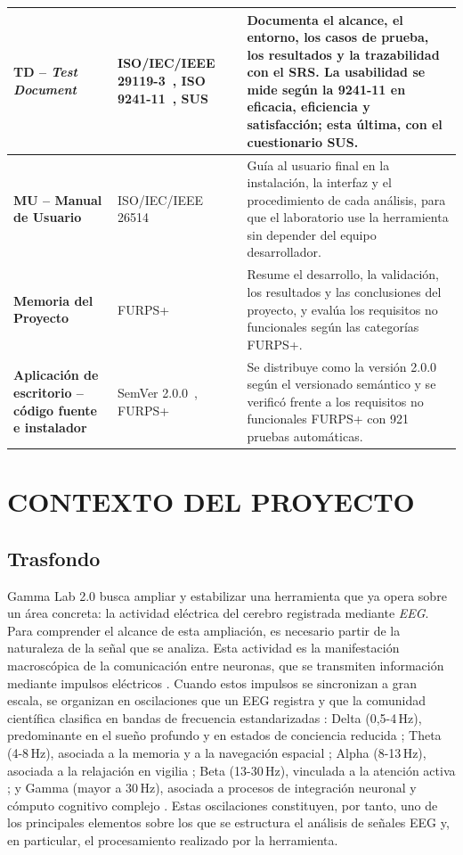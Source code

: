 \documentclass[12pt,letterpaper,oneside]{article}
\newcommand{\capitulo}[1]{\clearpage\section{#1}}
\begin{document}
\begin{longtable}{|>{\raggedright\arraybackslash}p{}|>{\raggedright\arraybackslash}p{}|>{\raggedright\arraybackslash}p{}|}
\hline
\textbf{TD -- \textit{Test Document}} & ISO/IEC/IEEE 29119-3~\cite{iso29119-3}, ISO 9241-11~\cite{iso9241-11}, SUS~\cite{brooke1996} & Documenta el alcance, el entorno, los casos de prueba, los resultados y la trazabilidad con el SRS. La usabilidad se mide según la 9241-11 en eficacia, eficiencia y satisfacción; esta última, con el cuestionario SUS. \\
\hline
\textbf{MU -- Manual de Usuario} & ISO/IEC/IEEE 26514~\cite{iso26514} & Guía al usuario final en la instalación, la interfaz y el procedimiento de cada análisis, para que el laboratorio use la herramienta sin depender del equipo desarrollador. \\
\hline
\textbf{Memoria del Proyecto} & FURPS+~\cite{eeles2001} & Resume el desarrollo, la validación, los resultados y las conclusiones del proyecto, y evalúa los requisitos no funcionales según las categorías FURPS+. \\
\hline
\textbf{Aplicación de escritorio -- código fuente e instalador} & SemVer 2.0.0~\cite{semver}, FURPS+~\cite{eeles2001} & Se distribuye como la versión 2.0.0 según el versionado semántico y se verificó frente a los requisitos no funcionales FURPS+ con 921 pruebas automáticas. \\
\hline
\end{longtable}
\endgroup

\capitulo{CONTEXTO DEL PROYECTO}

\subsection{Trasfondo}

Gamma Lab 2.0 busca ampliar y estabilizar una herramienta que ya opera sobre un área concreta: la actividad eléctrica del cerebro registrada mediante \textit{EEG}. Para comprender el alcance de esta ampliación, es necesario partir de la naturaleza de la señal que se analiza. Esta actividad es la manifestación macroscópica de la comunicación entre neuronas, que se transmiten información mediante impulsos eléctricos \cite{morris2025}. Cuando estos impulsos se sincronizan a gran escala, se organizan en oscilaciones que un EEG registra y que la comunidad científica clasifica en bandas de frecuencia estandarizadas \cite{nunez2017}: Delta (0,5-4\,Hz), predominante en el sueño profundo y en estados de conciencia reducida \cite{kropotov2009}; Theta (4-8\,Hz), asociada a la memoria y a la navegación espacial \cite{buzsaki2005}; Alpha (8-13\,Hz), asociada a la relajación en vigilia \cite{nunez2017}; Beta (13-30\,Hz), vinculada a la atención activa \cite{nunez2017}; y Gamma (mayor a 30\,Hz), asociada a procesos de integración neuronal y cómputo cognitivo complejo \cite{normaleeg2019}. Estas oscilaciones constituyen, por tanto, uno de los principales elementos sobre los que se estructura el análisis de señales EEG y, en particular, el procesamiento realizado por la herramienta.
\end{document}
